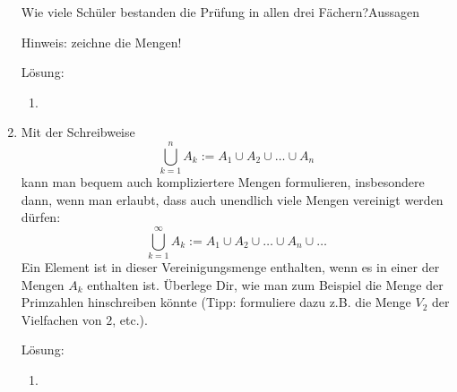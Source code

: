 \documentclass[../main.tex]{subfiles}
\begin{document}
\begin{enumerate}
	      Wie viele Schüler bestanden die Prüfung in allen drei Fächern?Aussagen

	      Hinweis: zeichne die Mengen!

	      Lösung:
	      \begin{enumerate}
		      \item
	      \end{enumerate}
	\item Mit der Schreibweise
	      \[ \bigcup_{k = 1}^{n} A_k := A_1 \cup A_2 \cup \dots \cup A_n \]
	      kann man bequem auch kompliziertere Mengen formulieren, insbesondere dann, wenn man
	      erlaubt, dass auch unendlich viele Mengen vereinigt werden dürfen:
	      \[ \bigcup_{k = 1}^{\infty} A_k := A_1 \cup A_2 \cup \dots \cup A_n \cup \dots \]
	      Ein Element ist in dieser Vereinigungsmenge enthalten, wenn es in einer der Mengen \( A_k \) enthalten ist.
	      Überlege Dir, wie man zum Beispiel die Menge der Primzahlen hinschreiben könnte
	      (Tipp: formuliere dazu z.B. die Menge \( V_2 \) der Vielfachen von \( 2 \), etc.).

	      Lösung:
	      \begin{enumerate}
		      \item
	      \end{enumerate}
\end{enumerate}
\end{document}
